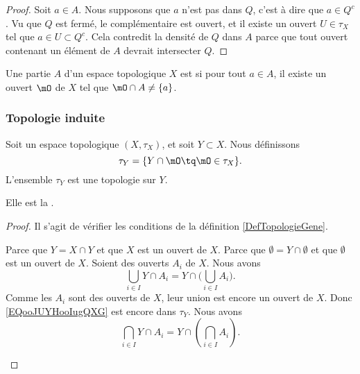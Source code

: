 \begin{proof}
	Soit \( a\in A\). Nous supposons que \( a\) n'est pas dans \( Q\), c'est à dire que \( a\in Q^c\). Vu que \( Q\) est fermé, le complémentaire est ouvert, et il existe un ouvert \( U\in\tau_X\) tel que \( a\in U\subset Q^c\). Cela contredit la densité de \( Q\) dans \( A\) parce que tout ouvert contenant un élément de \( A\) devrait intersecter \( Q\).
\end{proof}


\begin{definition}	\label{DEFooQUNJooWZasqV}
	Une partie \( A\) d'un espace topologique \( X\) est  si pour tout \( a\in A\), il existe un ouvert \( \mO\) de \( X\) tel que \( \mO\cap A\neq \{ a \}\).
\end{definition}


\subsubsection{Topologie induite}

\begin{propositionDef} \label{DefVLrgWDB}
	Soit un espace topologique \( (X, \tau_X) \), et soit \( Y \subset X \). Nous définissons
	\begin{equation}
		\tau_Y=\{ Y\cap\mO\tq \mO\in\tau_X \}.
	\end{equation}
	L'ensemble \( \tau_Y\) est une topologie sur \( Y\).

	Elle est la .
\end{propositionDef}

\begin{proof}
	Il s'agit de vérifier les conditions de la définition \ref{DefTopologieGene}.

	\begin{subproof}
		\spitem[\( Y\in \tau_Y\)]
		Parce que \( Y=X\cap Y\) et que \( X\) est un ouvert de \( X\).
		Parce que \( \emptyset = Y\cap\emptyset\) et que \( \emptyset\) est un ouvert de \( X\).
		Soient des ouverts \( A_i\) de \( X\). Nous avons
		\begin{equation}        \label{EQooJUYHooIugQXG}
			\bigcup_{i\in I}Y\cap A_i=Y\cap\big( \bigcup_{i\in I}A_i \big).
		\end{equation}
		Comme les \( A_i\) sont des ouverts de \( X\), leur union est encore un ouvert de \( X\). Donc \eqref{EQooJUYHooIugQXG} est encore dans \( \tau_Y\).
		Nous avons
		\begin{equation}
			\bigcap_{i\in I}Y\cap A_i=Y\cap\left( \bigcap_{i\in I}A_i \right).
		\end{equation}
	\end{subproof}
\end{proof}


